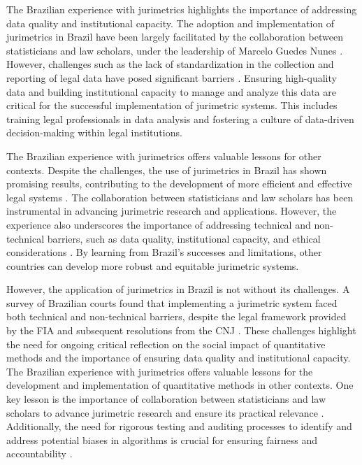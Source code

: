 The Brazilian experience with jurimetrics highlights the importance of addressing data quality and institutional capacity. The adoption and implementation of jurimetrics in Brazil have been largely facilitated by the collaboration between statisticians and law scholars, under the leadership of Marcelo Guedes Nunes \cite{10.1007/s11186-021-09453-1,10.3390/fi9040068}. However, challenges such as the lack of standardization in the collection and reporting of legal data have posed significant barriers \cite{10.1007/s11186-021-09453-1,10.5040/9781350220645}. Ensuring high-quality data and building institutional capacity to manage and analyze this data are critical for the successful implementation of jurimetric systems. This includes training legal professionals in data analysis and fostering a culture of data-driven decision-making within legal institutions.

The Brazilian experience with jurimetrics offers valuable lessons for other contexts. Despite the challenges, the use of jurimetrics in Brazil has shown promising results, contributing to the development of more efficient and effective legal systems \cite{10.1007/s11186-021-09453-1,10.5040/9781350220645}. The collaboration between statisticians and law scholars has been instrumental in advancing jurimetric research and applications. However, the experience also underscores the importance of addressing technical and non-technical barriers, such as data quality, institutional capacity, and ethical considerations \cite{10.1007/s11186-021-09453-1,10.5040/9781350220645}. By learning from Brazil's successes and limitations, other countries can develop more robust and equitable jurimetric systems.

However, the application of jurimetrics in Brazil is not without its challenges. A survey of Brazilian courts found that implementing a jurimetric system faced both technical and non-technical barriers, despite the legal framework provided by the FIA and subsequent resolutions from the CNJ \cite{10.1007/s11186-021-09453-1,international2015,10.3390/fi9040068}. These challenges highlight the need for ongoing critical reflection on the social impact of quantitative methods and the importance of ensuring data quality and institutional capacity. The Brazilian experience with jurimetrics offers valuable lessons for the development and implementation of quantitative methods in other contexts. One key lesson is the importance of collaboration between statisticians and law scholars to advance jurimetric research and ensure its practical relevance \cite{10.1007/s11186-021-09453-1,10.3390/fi9040068}. Additionally, the need for rigorous testing and auditing processes to identify and address potential biases in algorithms is crucial for ensuring fairness and accountability \cite{10.1590/dados.2022.65.3.267,10.1007/978-3-319-44000-215}.

